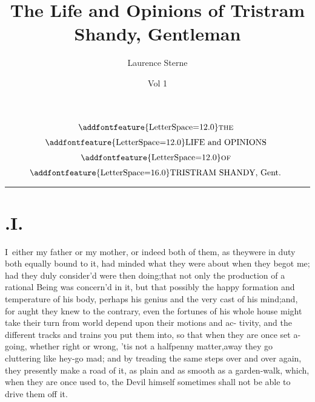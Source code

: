 \documentclass{article}
\title{The Life and Opinions of Tristram Shandy, Gentleman}
\author{Laurence Sterne}
\date{Vol 1}
\begin{document}
\pagestyle{fancy}
\thispagestyle{empty}
\[\vbox{\openup 6pt\halign{\hss # \hss\cr
\addfontfeature{LetterSpace=12.0}\textsc{the}\cr
\addfontfeature{LetterSpace=12.0}LIFE and OPINIONS\cr
\addfontfeature{LetterSpace=12.0}\textsc{of}\cr
{\addfontfeature{LetterSpace=16.0}TRISTRAM SHANDY}, Gent.\cr}}\]

\vskip 6pt
\hrule
\setlength{\baselineskip}{14pt}  %

\section{.\enspace I.}

\lettrine{I}{\,} either my father or my mother,
or indeed both of them, as
they\break were in duty both equally bound to it, had minded what they were about
when they begot me; had they duly consider’d 
were then doing;\tsk  that not only the production of a rational Being
was concern’d in it, but that possibly the happy formation and temperature of
his body, 
perhaps his genius and the very cast of\break
his mind;\tsk  and, for aught they knew to the contrary, even the fortunes of his
whole house might take their turn from 
world depend upon their motions and ac-
tivity, and the different tracks and trains you put them into, so that when they are
once set a-going, whether right or wrong, ’tis not a halfpenny matter,\tsk away
they go cluttering like hey-go mad; and by treading the same steps over and over
again, they presently make a road of it, as plain and as smooth as a garden-walk,
which, when they are once used to, the Devil himself sometimes shall not be able to
drive them off it.
\end{document}
